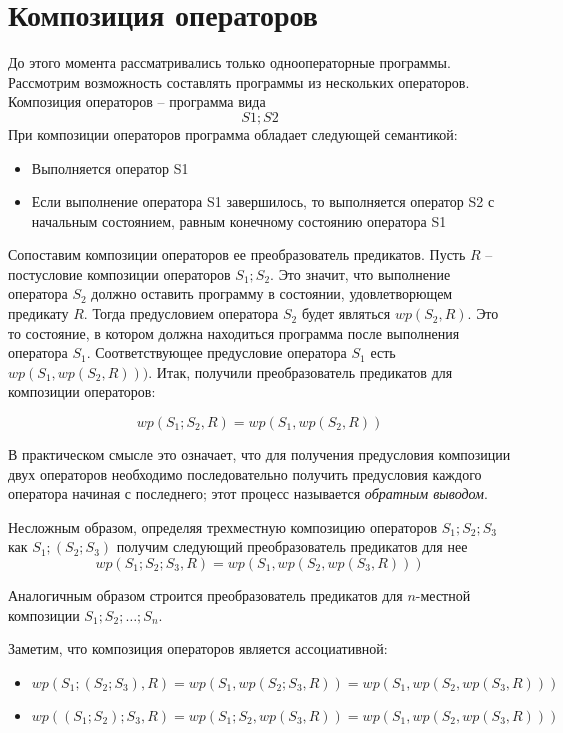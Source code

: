 \section{Композиция операторов}
До этого момента рассматривались только однооператорные программы. Рассмотрим возможность составлять
программы из нескольких операторов. Композиция операторов -- программа вида
$$ S1; S2 $$
При композиции операторов программа обладает следующей семантикой:
\begin{itemize}
	\item Выполняется оператор S1
	\item Если выполнение оператора S1 завершилось, то выполняется оператор S2 с начальным состоянием,
	равным конечному состоянию оператора S1
\end{itemize}

Сопоставим композиции операторов ее преобразователь предикатов. Пусть $R$ -- постусловие композиции операторов $S_1; S_2$.
Это значит, что выполнение оператора $S_2$ должно оставить программу в состоянии, удовлетворющем предикату $R$.
Тогда предусловием оператора $S_2$ будет являться $wp(S_2 ,R)$. Это то состояние, в котором должна находиться программа
после выполнения оператора $S_1$. Соответствующее предусловие
оператора $S_1$ есть $wp(S_1, wp(S_2, R)))$. Итак, получили преобразователь предикатов для композиции операторов:

\begin{equation}
	wp(S_1; S_2, R) = wp(S_1, wp(S_2, R))
\end{equation}

В практическом смысле это означает, что для получения предусловия композиции двух операторов необходимо
последовательно получить предусловия каждого оператора начиная с последнего; этот процесс называется \textit{обратным выводом}.

Несложным образом, определяя трехместную композицию операторов $S_1; S_2; S_3$ как $S_1; (S_2; S_3)$ получим
следующий преобразователь предикатов для нее
\begin{equation}
	wp(S_1; S_2; S_3, R) = wp(S_1, wp(S_2, wp(S_3, R)))
\end{equation}

Аналогичным образом строится преобразователь предикатов для $n$-местной композиции $S_1; S_2; \ldots; S_n$. 

Заметим, что композиция операторов является ассоциативной:
\begin{itemize}
	\item $wp(S_1; (S_2; S_3), R) = wp(S_1, wp(S_2; S_3, R)) = wp(S_1, wp(S_2, wp(S_3, R)))$
	\item $wp((S_1; S_2); S_3, R) = wp(S_1; S_2, wp(S_3, R)) = wp(S_1, wp(S_2, wp(S_3, R)))$
\end{itemize}
